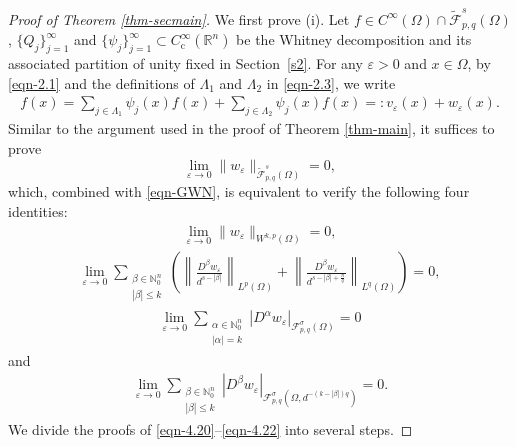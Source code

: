 \documentclass[11pt,twoside]{article}
\def\nn{{\mathbb N}}
\def\nno{\nn_0}
\def\cf{{\mathcal F}}
\def\az{\alpha}
\def\bz{\beta}
\def\boz{{\Omega}}
\def\sz{\sigma}
\def\we{w_{\varepsilon}}
\def\adk{\sum_{\substack{\az\in\nno^n \\ \lvert \alpha \rvert = k}}}
\def\huae{\varepsilon}
\theoremstyle{mylem}
\theoremstyle{definition}
\numberwithin{equation}{section}
\begin{document}
\begin{proof}[Proof of Theorem \ref{thm-secmain}]
We first prove (i). Let 
\( f \in C^\infty(\boz)\cap\widetilde{\mathscr{F}}_{p,q}^{s}(\boz)\),  
\( \{Q_j\}_{j=1}^{\infty} \) and \( \{\psi_j\}_{j=1}^{\infty} \subset C_{\mathrm{c}}^\infty(\mathbb{R}^n) \) 
be the Whitney decomposition and its associated partition of unity fixed in Section~\ref{s2}. For any \( \varepsilon > 0 \) and \( x \in \Omega \), by \eqref{eqn-2.1} and the definitions of \( \Lambda_1\) and \( \Lambda_2 \) in \eqref{eqn-2.3}, we write
\begin{align}\label{eqn-4.19}
f(x)= \sum_{j \in \Lambda_1} \psi_j(x) f(x) + \sum_{j \in \Lambda_2} \psi_j(x) f(x)
=: v_{\varepsilon}(x) + w_{\varepsilon}(x).
\end{align}
Similar to the argument used in the proof of Theorem \ref{thm-main},  it suffices to prove
$$
\lim_{\huae \to 0} \| \we \|_{\widetilde{\mathscr{F}}_{p,q}^{s}(\boz)}=0,
$$
which, combined with \eqref{eqn-GWN}, is equivalent to verify the following four identities:
\begin{align}\label{eqn-4.20}
\lim_{\huae \to 0} \| \we \|_{W^{k,p}(\Omega)}=0,
\end{align}
\begin{align}\label{1048}
\lim_{\varepsilon\to0}
\sum_{\substack{\bz\in\nno^n \\ |\bz| \leq k}}
\left(\left\|\frac{D^\beta w_\varepsilon}{d^{s-|\beta|}}\right\|_{L^p(\Omega)}+\left\|\frac{D^\beta w_\varepsilon}{d^{s-|\beta|+\frac{n}{q}}}\right\|_{L^q(\Omega)}\right)=0,
\end{align}
\begin{align}\label{eqn-4.21}
\lim_{\huae \to 0} \adk \left| D^{\az} \we \right|_{\cf_{p,q}^{\sz}(\boz)}=0
\end{align}
and
\begin{align}\label{eqn-4.22}
\lim_{\huae \to 0}
\sum_{\substack{\bz\in\nno^n \\ | \bz| \leq k}} \left|D^{\bz}\we\right|_{\cf_{p,q}^{\sz}(\boz,d^{-(k-|\bz|)q})}=0.
\end{align}
We divide the proofs of \eqref{eqn-4.20}--\eqref{eqn-4.22} into several steps.


\end{proof}
\end{document}
